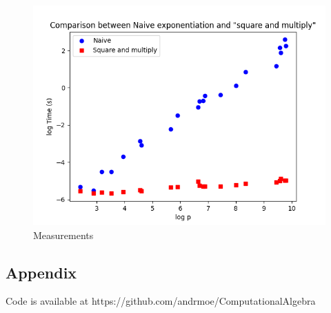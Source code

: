 \documentclass[12pt,a4paper]{article}
\begin{document}
\begin{figure}[htbp]
    \centering
    \includegraphics[width=\linewidth]{plot_2025-01-24 14-39-00_0.png}
    \caption{Measurements}
    \label{figure1}
\end{figure}
\newpage
\begin{appendix}
\section*{Appendix}
    Code is available at https://github.com/andrmoe/ComputationalAlgebra
    
    
\end{appendix}
\end{document}
